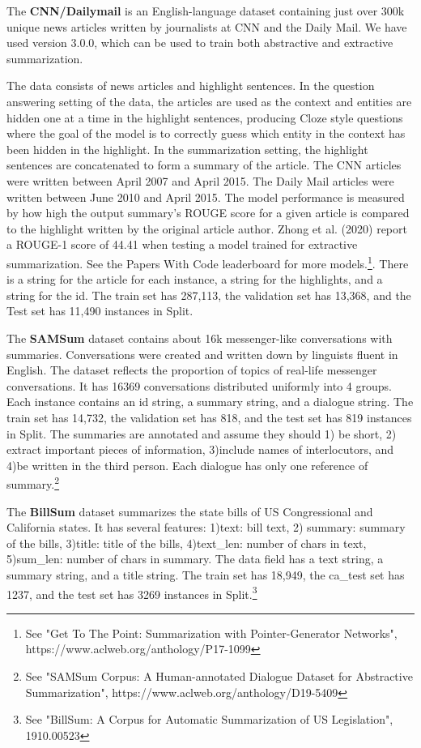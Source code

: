 \documentclass[twoside,twocolumn]{article}
\begin{document}
The \textbf{CNN/Dailymail} is an English-language dataset containing just over 300k unique news articles written by journalists at CNN and the Daily Mail. We have used version 3.0.0, which can be used to train both abstractive and extractive summarization.\par
The data consists of news articles and highlight sentences. In the question answering setting of the data, the articles are used as the context and entities are hidden one at a time in the highlight sentences, producing Cloze style questions where the goal of the model is to correctly guess which entity in the context has been hidden in the highlight. In the summarization setting, the highlight sentences are concatenated to form a summary of the article. The CNN articles were written between April 2007 and April 2015. The Daily Mail articles were written between June 2010 and April 2015.
The model performance is measured by how high the output summary's ROUGE score for a given article is compared to the highlight written by the original article author. Zhong et al. (2020) report a ROUGE-1 score of 44.41 when testing a model trained for extractive summarization. See the Papers With Code leaderboard for more models.\footnote{See "Get To The Point: Summarization with Pointer-Generator Networks", https://www.aclweb.org/anthology/P17-1099}. There is a string for the article for each instance, a string for the highlights, and a string for the id.  The train set has 287,113, the validation set has 13,368, and the Test set has 11,490 instances in Split.

The \textbf{SAMSum} dataset contains about 16k messenger-like conversations with summaries. Conversations were created and written down by linguists fluent in English. The dataset reflects the proportion of topics of real-life messenger conversations.  It has 16369 conversations distributed uniformly into 4 groups. Each instance contains an id string, a summary string, and a dialogue string.  The train set has 14,732, the validation set has 818, and the test set has 819 instances in Split.  The summaries are annotated and assume they should 1) be short, 2) extract important pieces of information, 3)include names of interlocutors, and 4)be written in the third person. Each dialogue has only one reference of summary.\footnote{See "{SAMS}um Corpus: A Human-annotated Dialogue Dataset for Abstractive Summarization", https://www.aclweb.org/anthology/D19-5409} \par

The \textbf{BillSum} dataset summarizes the state bills of US Congressional and California states. It has several features: 1)text: bill text, 2) summary: summary of the bills, 3)title: title of the bills, 4)text\_len: number of chars in text, 5)sum\_len: number of chars in summary. The data field has a text string, a \cite{aksenov2020abstractive} summary string, and a title string. The train set has 18,949,  the ca\_test set has 1237, and the test set has 3269 instances in Split.\footnote{See "BillSum: A Corpus for Automatic Summarization of US Legislation", 1910.00523}
\end{document}
